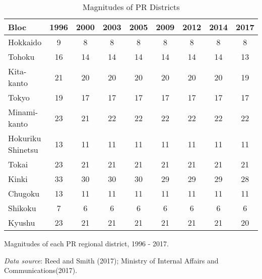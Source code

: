 \begin{table}
\begin{threeparttable}
\begin{tabular}{l|cccccccc}
\toprule
Bloc & 1996 & 2000 & 2003 & 2005 & 2009 & 2012 & 2014 & 2017 \\
\midrule
Hokkaido & 9 & 8 & 8 & 8 & 8 & 8 & 8 & 8 \\
Tohoku & 16 & 14 & 14 & 14 & 14 & 14 & 14 & 13 \\
Kita-kanto & 21 & 20 & 20 & 20 & 20 & 20 & 20 & 19 \\
Tokyo & 19 & 17 & 17 & 17 & 17 & 17 & 17 & 17 \\
Minami-kanto & 23 & 21 & 22 & 22 & 22 & 22 & 22 & 22 \\
Hokuriku Shinetsu & 13 & 11 & 11 & 11 & 11 & 11 & 11 & 11 \\
Tokai & 23 & 21 & 21 & 21 & 21 & 21 & 21 & 21 \\
Kinki & 33 & 30 & 30 & 30 & 29 & 29 & 29 & 28 \\
Chugoku & 13 & 11 & 11 & 11 & 11 & 11 & 11 & 11 \\
Shikoku & 7 & 6 & 6 & 6 & 6 & 6 & 6 & 6 \\
Kyushu & 23 & 21 & 21 & 21 & 21 & 21 & 21 & 20 \\
\bottomrule
\end{tabular}
\begin{tablenotes}[flushleft]
  \scriptsize{
    \item Magnitudes of each PR regional district, 1996 - 2017. 
    \item \textit{Data source}: Reed and Smith (2017); Ministry of Internal Affairs and Communications(2017).
  }
\end{tablenotes}
\end{threeparttable}
\caption{Magnitudes of PR Districts}
\label{table:distM}
\end{table}